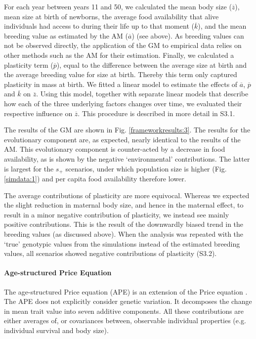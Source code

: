 For each year between years 11 and 50, we calculated the mean body size ($\overline z$), mean size at birth of newborns, the average food availability that alive individuals had access to during their life up to that moment ($\overline k$), and the mean breeding value as estimated by the AM ($\overline a$) (see above). As breeding values can not be observed directly, the application of the GM to empirical data relies on other methods such as the AM for their estimation. Finally, we calculated a plasticity term ($\overline p$), equal to the difference between the average size at birth and the average breeding value for size at birth. Thereby this term only captured plasticity in mass at birth. 
We fitted a linear model to estimate the effects of $\overline a$, $\overline p$ and $\overline k$ on $\overline z$. Using this model, together with separate linear models that describe how each of the three underlying factors changes over time, we evaluated their respective influence on $\overline z$. This procedure is described in more detail in S3.1.

The results of the GM are shown in Fig. \ref{frameworkresults:3}. The results for the evolutionary component are, as expected, nearly identical to the results of the AM. This evolutionary component is counter-acted by a decrease in food availability, as is shown by the negative `environmental' contributions. The latter is largest for the $s_+$ scenarios, under which population size is higher (Fig. \ref{simdata:1}) and per capita food availability therefore lower. 

The average contributions of plasticity are more equivocal. Whereas we expected the slight reduction in maternal body size, and hence in the maternal effect, to result in a minor negative contribution of plasticity, we instead see mainly positive contributions. This is the result of the downwardly biased trend in the breeding values (as discussed above). When the analysis was repeated with the `true' genotypic values from the simulations instead of the estimated breeding values, all scenarios showed negative contributions of plasticity (S3.2).

\paragraph{Age-structured Price Equation}
The age-structured Price equation (APE) \parencite{Coulson2008} is an extension of the Price equation \parencite{Price1970}. The APE does not explicitly consider genetic variation. It decomposes the change in mean trait value into seven additive components. All these contributions are either averages of, or covariances between, observable individual properties (e.g. individual survival and body size). 

